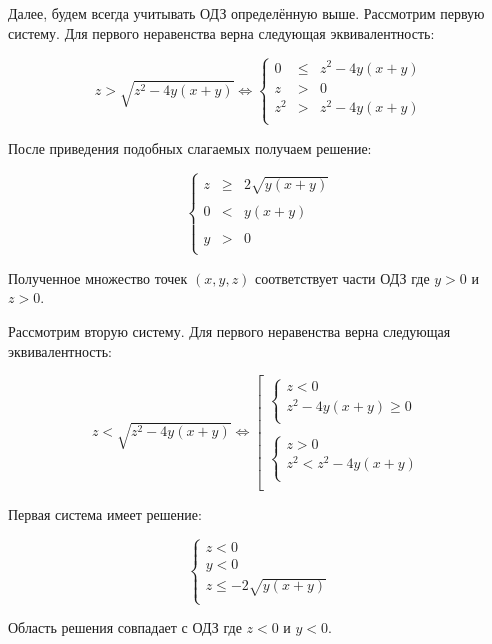 Далее, будем всегда учитывать ОДЗ определённую выше. Рассмотрим первую систему. Для первого неравенства верна следующая эквивалентность:

$$
z>\sqrt{z^2-4y(x+y)} \Leftrightarrow \left\{ \begin{array}{ccl}
0 & \leq & z^2-4y(x+y)  \\
z & > & 0 \\
z^2 & > & z^2-4y(x+y)\\
\end{array}
\right.
$$

После приведения подобных слагаемых получаем решение:

$$
\left\{
\begin{array}{ccl}
z & \geq & 2\sqrt{y(x+y)} \\
\\
0 & < & y(x+y) \\
\\
y & > & 0\\
\end{array}
\right.
$$

Полученное множество точек $(x,y,z)$ соответствует части ОДЗ где $y>0$ и $z>0$.

Рассмотрим вторую систему. Для первого неравенства верна следующая эквивалентность:

$$
z<\sqrt{z^2-4y(x+y)}\Leftrightarrow
\left[
\begin{array}{l}
    \left\{
    \begin{array}{l}
    z<0\\
    z^2-4y(x+y)\geq 0\\
    \end{array}
    \right.\\
    \\
    \left\{
    \begin{array}{l}
    z>0\\
    z^2<z^2-4y(x+y)\\
    \end{array}
    \right.\\
\end{array}
\right.
$$

Первая система имеет решение:

$$
\left\{
\begin{array}{l}
z<0\\
y<0\\
z\leq-2\sqrt{y(x+y)}\\
\end{array}
\right.
$$

Область решения совпадает с ОДЗ где $z<0$ и $y<0$.


